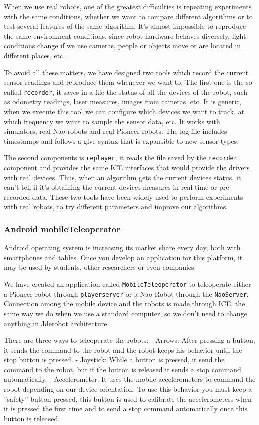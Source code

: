\documentclass[twocolumn]{svjour3}          %
\begin{document}
When we use real robots, one of the greatest difficulties is repeating experiments with the same conditions, whether we want to compare different algorithms or to test several features of the same algorithm. It's almost impossible to reproduce the same environment conditions, since robot hardware behaves diversely, light conditions change if we use cameras, people or objects move or are located in different places, etc.

To avoid all these matters, we have designed two tools which record the current sensor readings and reproduce them whenever we want to. The first one is the so-called \texttt{recorder}, it saves in a file the status of all the devices of the robot, such as odometry readings, laser measures, images from cameras, etc. It is generic, when we execute this tool we can configure which devices we want to track, at which frequency we want to sample the sensor data, etc. It works with simulators, real Nao robots and real Pioneer robots. The log file includes timestamps and follows a give syntax that is expansible to new sensor types.

The second components is \texttt{replayer}, it reads the file saved by the \texttt{recorder} component and provides the same ICE interfaces that would provide the drivers with real devices. Thus, when an algorithm gets the current devices status, it can't tell if it's obtaining the current devices measures in real time or pre-recorded data. These two tools have been widely used to perform experiments with real robots, to try different parameters and improve our algorithms.

\subsubsection{Android mobileTeleoperator}

Android operating system is increasing its market share every day, both with smartphones and tables. Once you develop an application for this platform, it may be used by students, other researchers or even companies. 

We have created an application called \texttt{MobileTeleoperator} to teleoperate either a Pioneer robot through \texttt{playerserver} or a Nao Robot through the \texttt{NaoServer}. Connection among the mobile device and the robots is made through ICE, the same way we do when we use a standard computer, so we don't need to change anything in Jderobot architecture.

There are three ways to teleoperate the robots:
- Arrows: After pressing a button, it sends the command to the robot and the robot keeps his behavior until the stop button is pressed.
- Joystick: While a button is pressed, it send the command to the robot, but if the button is released it sends a stop command automatically.
- Accelerometer: It uses the mobile accelerometers to command the robot depending on our device orientation. To use this behavior you must keep a ''safety'' button pressed, this button is used to calibrate the accelerometers when it is pressed the first time and to send a stop command automatically once this button is released.
\end{document}
